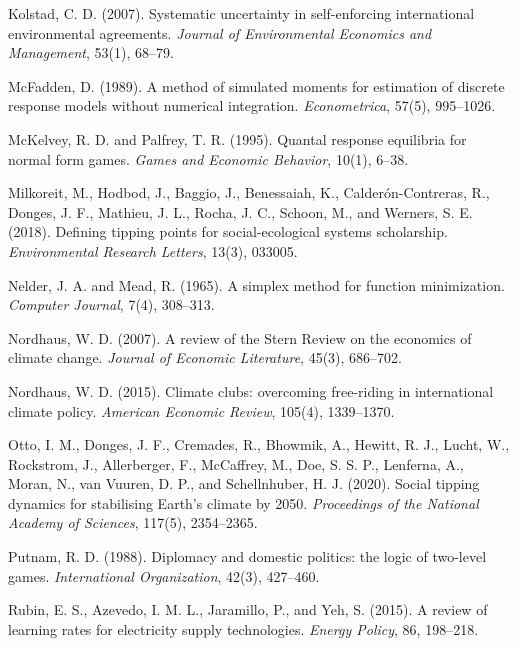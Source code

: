 \documentclass[10pt,a4paper]{article}
\begin{document}
\begin{list}{}{\setlength\leftmargin{1.5em}\setlength\itemindent{-1.5em}\setlength\itemsep{0.4em}}
\item Kolstad, C. D. (2007). Systematic uncertainty in self-enforcing international environmental
agreements. \textit{Journal of Environmental Economics and Management}, 53(1), 68--79.

\item McFadden, D. (1989). A method of simulated moments for estimation of discrete response models
without numerical integration. \textit{Econometrica}, 57(5), 995--1026.

\item McKelvey, R. D. and Palfrey, T. R. (1995). Quantal response equilibria for normal form games.
\textit{Games and Economic Behavior}, 10(1), 6--38.

\item Milkoreit, M., Hodbod, J., Baggio, J., Benessaiah, K., Calder\'{o}n-Contreras, R., Donges, J. F.,
Mathieu, J. L., Rocha, J. C., Schoon, M., and Werners, S. E. (2018). Defining tipping points for
social-ecological systems scholarship. \textit{Environmental Research Letters}, 13(3), 033005.

\item Nelder, J. A. and Mead, R. (1965). A simplex method for function minimization. \textit{Computer
Journal}, 7(4), 308--313.

\item Nordhaus, W. D. (2007). A review of the Stern Review on the economics of climate change.
\textit{Journal of Economic Literature}, 45(3), 686--702.

\item Nordhaus, W. D. (2015). Climate clubs: overcoming free-riding in international climate policy.
\textit{American Economic Review}, 105(4), 1339--1370.

\item Otto, I. M., Donges, J. F., Cremades, R., Bhowmik, A., Hewitt, R. J., Lucht, W., Rockstrom, J.,
Allerberger, F., McCaffrey, M., Doe, S. S. P., Lenferna, A., Moran, N., van Vuuren, D. P., and
Schellnhuber, H. J. (2020). Social tipping dynamics for stabilising Earth's climate by 2050.
\textit{Proceedings of the National Academy of Sciences}, 117(5), 2354--2365.

\item Putnam, R. D. (1988). Diplomacy and domestic politics: the logic of two-level games.
\textit{International Organization}, 42(3), 427--460.

\item Rubin, E. S., Azevedo, I. M. L., Jaramillo, P., and Yeh, S. (2015). A review of learning rates for
electricity supply technologies. \textit{Energy Policy}, 86, 198--218.


\end{list}
\end{document}
